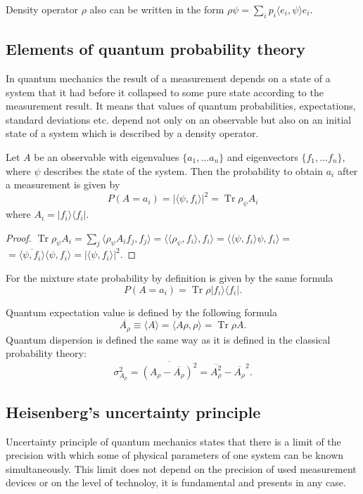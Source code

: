 \documentclass[11pt]{article}
\DeclareMathOperator{\Tr}{Tr}
\begin{document}
Density operator $\rho$ also can be written in the form $\rho\psi = \sum_i p_i\langle e_i, \psi\rangle e_i$. 

\subsection{Elements of quantum probability theory}
In quantum mechanics the result of a measurement depends on a state of a system that it had before it collapsed to some pure state according to the measurement result. It means that values of quantum probabilities, expectations, standard deviations etc. depend not only on an observable but also on an initial state of a system which is described by a density operator.

Let $A$ be an observable with eigenvalues $\{a_1,\ldots a_n\}$ and eigenvectors $\{f_1,\ldots f_n\}$, where $\psi$ describes the state of the system. Then the probability to obtain $a_i$ after a measurement is given by
\[
P(A = a_i) = |\langle\psi, f_i\rangle|^2 = \Tr \rho_\psi A_i
\]
where $A_i = |f_i\rangle \langle f_i|$.
\begin{proof}
$\Tr \rho_\psi A_i = \sum_j \langle\rho_\psi A_if_j, f_j\rangle = \langle \langle\rho_\psi, f_i\rangle, f_i\rangle = \langle \langle \psi, f_i\rangle\psi, f_i\rangle = $\\
$= \overline{\langle\psi, f_i\rangle} \langle\psi, f_i\rangle = |\langle\psi, f_i\rangle|^2.$
\end{proof}
For the mixture state probability by definition is given by the same formula
\[
P(A = a_i) = \Tr \rho |f_i\rangle \langle f_i|.
\]

Quantum expectation value is defined by the following formula
\[
\overline{A_\rho} \equiv \langle A\rangle = \langle A\rho, \rho\rangle = \Tr\rho A.
\]
Quantum dispersion is defined the same way as it is defined in the classical probability theory:
\[
\sigma^2_{A_\rho} = \overline{\left(A_\rho - \overline{A_\rho}\right)^2} = \overline{A^2_\rho} - \overline{A_\rho}^2.
\] 

\subsection{Heisenberg's uncertainty principle}
Uncertainty principle of quantum mechanics states that there is a limit of the precision with which some of physical parameters of one system can be known simultaneously. This limit does not depend on the precision of used measurement devices or on the level of technoloy, it is fundamental and presents in any case.
\end{document}
